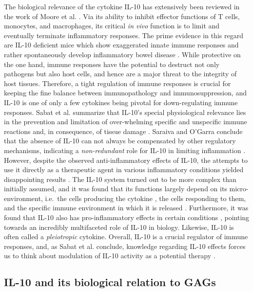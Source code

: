 The biological relevance of the cytokine IL-10 has extensively been reviewed in
the work of Moore et al. \cite{moore_2001}. Via its ability to inhibit effector
functions of T cells, monocytes, and macrophages, its critical
\textit{in vivo} function is to limit and eventually terminate inflammatory
responses. The prime evidence in this regard are IL-10 deficient mice which show
exaggerated innate immune responses and rather spontaneously develop
inflammatory bowel disease \cite{mueller_il10defmouse_1993,
roers_il10_mice_2004,rubtsov_il10_mice_2008}. While protective on the one hand,
immune responses have the potential to destruct not only pathogens but also host
cells, and hence are a major threat to the integrity of host tissues. Therefore,
a tight regulation of immune responses is crucial for keeping the fine balance
between immunopathology and immunosuppression, and IL-10 is one of only a few
cytokines being pivotal for down-regulating immune responses. Sabat et al.
summarize that IL-10's special physiological relevance lies in the prevention
and limitation of over-whelming specific and unspecific immune reactions and, in
consequence, of tissue damage \cite{sabat_bio_il10_review_2010}. Saraiva and
O'Garra conclude that the absence of IL-10 can not always be compensated by
other regulatory mechanisms, indicating a \textit{non-redundant} role for IL-10
in limiting inflammation \cite{saraiva_ogarra_2010}. However, despite the
observed anti-inflammatory effects of IL-10, the attempts to use it directly as
a therapeutic agent in various inflammatory conditions yielded disappointing
results \cite{il10_therapy_review_2003}. The IL-10 system turned out to be more
complex than initially assumed, and it was found that its functions largely
depend on its micro-environment, i.e.\ the cells producing the cytokine
\cite{roers_mueller_2008}, the cells responding to them, and the specific immune
environment in which it is released \cite{mosser_il10_newperspectives_2008}.
Furthermore, it was found that IL-10 also has pro-inflammatory effects in
certain conditions \cite{lauw_il10_proinflamm_2000}, pointing towards an
incredibly multifaceted role of IL-10 in biology. Likewise, IL-10 is often
called a \textit{pleiotropic} cytokine. Overall, IL-10 is a crucial regulator of
immune responses, and, as Sabat et al. conclude, knowledge regarding IL-10
effects forces us to think about modulation of IL-10 activity as a potential
therapy \cite{sabat_bio_il10_review_2010}.


\subsection{IL-10 and its biological relation to GAGs}

